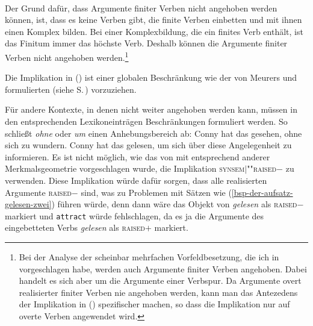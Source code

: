 {\eas
{} \impl \\
\hfill{}
\zs
Der Grund dafür, dass Argumente finiter Verben nicht angehoben werden können,
ist, dass es keine Verben gibt, die finite Verben einbetten und mit ihnen einen Komplex bilden.
Bei einer Komplexbildung, die ein finites Verb enthält, ist das Finitum immer das höchste
Verb. Deshalb können die Argumente finiter Verben nicht angehoben werden.\footnote{
  Bei der Analyse der scheinbar mehrfachen Vorfeldbesetzung, die ich in 
  vorgeschlagen habe, werden auch Argumente finiter Verben angehoben. Dabei handelt es sich aber um
  die Argumente einer Verbspur. Da Argumente overt realisierter finiter Verben nie angehoben werden,
  kann man das Antezedens der Implikation in () spezifischer machen, so dass die Implikation
  nur auf overte Verben angewendet wird.%
}

Die Implikation in () ist einer globalen Beschränkung wie der von Meurers und \prz
formulierten (siehe S.\,\pageref{raised-wert}) vorzuziehen.

Für andere Kontexte, in denen nicht weiter angehoben werden kann, müssen in den entsprechenden
Lexikoneinträgen Beschränkungen formuliert werden. So schließt \zb \emph{ohne} oder \emph{um}
einen Anhebungsbereich ab:
\eal
\ex Conny hat das gesehen, ohne sich zu wundern.
\ex Conny hat das gelesen, um sich über diese Angelegenheit zu informieren.
\zl
Es ist nicht möglich, wie das von \citet[, Fußnote~54]{MdK2001a} mit entsprechend
anderer Merkmalsgeometrie vorgeschlagen wurde, die Implikation  \impl \textsc{synsem$|$""raised}$-$
zu verwenden. Diese Implikation würde dafür sorgen, dass alle realisierten Argumente \textsc{raised}$-$
sind, was zu Problemen mit Sätzen wie (\ref{bsp-der-aufsatz-gelesen-zwei}) führen würde, denn dann
wäre das Objekt von \emph{gelesen} als \textsc{raised}$-$ markiert und \texttt{attract} würde
fehlschlagen, da es ja die Argumente des eingebetteten Verbs \emph{gelesen} als \textsc{raised}$+$
markiert.

}
